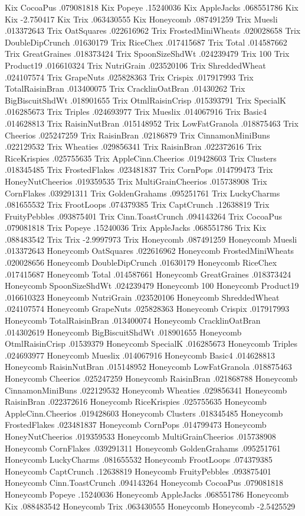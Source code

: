Kix	CocoaPus	.079081818
Kix	Popeye	.15240036
Kix	AppleJacks	.068551786
Kix	Kix	-2.750417
Kix	Trix	.063430555
Kix	Honeycomb	.087491259
Trix	Muesli	.013372643
Trix	OatSquares	.022616962
Trix	FrostedMiniWheats	.020028658
Trix	DoubleDipCrunch	.01630179
Trix	RiceChex	.017415687
Trix	Total	.014587662
Trix	GreatGraines	.018373424
Trix	SpoonSizeShdWt	.024239479
Trix	100%
Trix	Product19	.016610324
Trix	NutriGrain	.023520106
Trix	ShreddedWheat	.024107574
Trix	GrapeNuts	.025828363
Trix	Crispix	.017917993
Trix	TotalRaisinBran	.013400075
Trix	CracklinOatBran	.01430262
Trix	BigBiscuitShdWt	.018901655
Trix	OtmlRaisinCrisp	.015393791
Trix	SpecialK	.016285673
Trix	Triples	.024693977
Trix	Mueslix	.014067916
Trix	Basic4	.014628813
Trix	RaisinNutBran	.015148952
Trix	LowFatGranola	.018875463
Trix	Cheerios	.025247259
Trix	RaisinBran	.02186879
Trix	CinnamonMiniBuns	.022129532
Trix	Wheaties	.029856341
Trix	RaisinBran	.022372616
Trix	RiceKrispies	.025755635
Trix	AppleCinn.Cheerios	.019428603
Trix	Clusters	.018345485
Trix	FrostedFlakes	.023481837
Trix	CornPops	.014799473
Trix	HoneyNutCheerios	.019359535
Trix	MultiGrainCheerios	.015738908
Trix	CornFlakes	.039291311
Trix	GoldenGrahams	.095251761
Trix	LuckyCharms	.081655532
Trix	FrootLoops	.074379385
Trix	CaptCrunch	.12638819
Trix	FruityPebbles	.093875401
Trix	Cinn.ToastCrunch	.094143264
Trix	CocoaPus	.079081818
Trix	Popeye	.15240036
Trix	AppleJacks	.068551786
Trix	Kix	.088483542
Trix	Trix	-2.9997973
Trix	Honeycomb	.087491259
Honeycomb	Muesli	.013372643
Honeycomb	OatSquares	.022616962
Honeycomb	FrostedMiniWheats	.020028656
Honeycomb	DoubleDipCrunch	.01630179
Honeycomb	RiceChex	.017415687
Honeycomb	Total	.014587661
Honeycomb	GreatGraines	.018373424
Honeycomb	SpoonSizeShdWt	.024239479
Honeycomb	100%
Honeycomb	Product19	.016610323
Honeycomb	NutriGrain	.023520106
Honeycomb	ShreddedWheat	.024107574
Honeycomb	GrapeNuts	.025828363
Honeycomb	Crispix	.017917993
Honeycomb	TotalRaisinBran	.013400074
Honeycomb	CracklinOatBran	.014302619
Honeycomb	BigBiscuitShdWt	.018901655
Honeycomb	OtmlRaisinCrisp	.01539379
Honeycomb	SpecialK	.016285673
Honeycomb	Triples	.024693977
Honeycomb	Mueslix	.014067916
Honeycomb	Basic4	.014628813
Honeycomb	RaisinNutBran	.015148952
Honeycomb	LowFatGranola	.018875463
Honeycomb	Cheerios	.025247259
Honeycomb	RaisinBran	.021868788
Honeycomb	CinnamonMiniBuns	.022129532
Honeycomb	Wheaties	.029856341
Honeycomb	RaisinBran	.022372616
Honeycomb	RiceKrispies	.025755635
Honeycomb	AppleCinn.Cheerios	.019428603
Honeycomb	Clusters	.018345485
Honeycomb	FrostedFlakes	.023481837
Honeycomb	CornPops	.014799473
Honeycomb	HoneyNutCheerios	.019359533
Honeycomb	MultiGrainCheerios	.015738908
Honeycomb	CornFlakes	.039291311
Honeycomb	GoldenGrahams	.095251761
Honeycomb	LuckyCharms	.081655532
Honeycomb	FrootLoops	.074379385
Honeycomb	CaptCrunch	.12638819
Honeycomb	FruityPebbles	.093875401
Honeycomb	Cinn.ToastCrunch	.094143264
Honeycomb	CocoaPus	.079081818
Honeycomb	Popeye	.15240036
Honeycomb	AppleJacks	.068551786
Honeycomb	Kix	.088483542
Honeycomb	Trix	.063430555
Honeycomb	Honeycomb	-2.5425529
